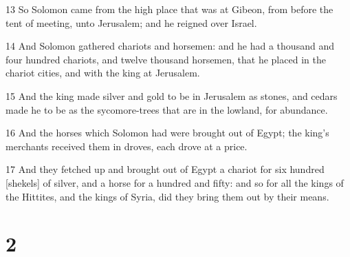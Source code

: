 \par 13 So Solomon came from the high place that was at Gibeon, from before the tent of meeting, unto Jerusalem; and he reigned over Israel.
\par 14 And Solomon gathered chariots and horsemen: and he had a thousand and four hundred chariots, and twelve thousand horsemen, that he placed in the chariot cities, and with the king at Jerusalem.
\par 15 And the king made silver and gold to be in Jerusalem as stones, and cedars made he to be as the sycomore-trees that are in the lowland, for abundance.
\par 16 And the horses which Solomon had were brought out of Egypt; the king's merchants received them in droves, each drove at a price.
\par 17 And they fetched up and brought out of Egypt a chariot for six hundred [shekels] of silver, and a horse for a hundred and fifty: and so for all the kings of the Hittites, and the kings of Syria, did they bring them out by their means.

\chapter{2}

